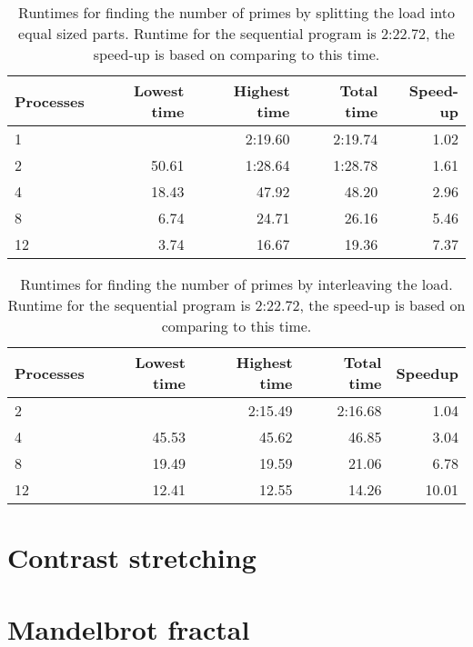 \documentclass[a4paper]{article}
\begin{document}
\begin{table}[h]
	\centering
	\caption{Runtimes for finding the number of primes by splitting the load into equal sized parts. Runtime for the sequential program is 2:22.72, the speed-up is based on comparing to this time.}
	\label{tbl:prime}
	\begin{tabular}{l|r|r|r|r}
		Processes & Lowest time & Highest time & Total time & Speed-up \\ \hline
		 1 &  & 2:19.60 & 2:19.74 & 1.02 \\
		 2 & 50.61 & 1:28.64 & 1:28.78 & 1.61 \\
		 4 & 18.43 & 47.92 & 48.20 & 2.96 \\
		 8 &  6.74 & 24.71 & 26.16 & 5.46 \\
		12 &  3.74 & 16.67 & 19.36 & 7.37 \\
	\end{tabular}
\end{table}

\begin{table}[h]
	\centering
	\caption{Runtimes for finding the number of primes by interleaving the load. Runtime for the sequential program is 2:22.72, the speed-up is based on comparing to this time.}
	\label{tbl:prime2}
	\begin{tabular}{l|r|r|r|r}
		Processes & Lowest time & Highest time & Total time & Speedup \\ \hline
		 2 &    & 2:15.49 & 2:16.68 & 1.04 \\
	 	 4 & 45.53 & 45.62 & 46.85 & 3.04 \\
	 	 8 & 19.49 & 19.59 & 21.06 & 6.78 \\
		12 & 12.41 & 12.55 & 14.26 & 10.01 \\
	\end{tabular}
\end{table}

\section{Contrast stretching}

\section{Mandelbrot fractal}
\end{document}
